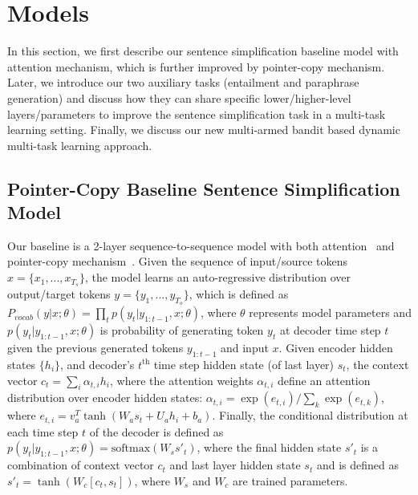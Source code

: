 \documentclass[11pt]{article}
\begin{document}
 

\section{Models}
\label{sec:models}

In this section, we first describe our sentence simplification baseline model with attention mechanism, which is further improved by pointer-copy mechanism. Later, we introduce our two auxiliary tasks (entailment and paraphrase generation) and discuss how they can share specific lower/higher-level layers/parameters to improve the sentence simplification task in a multi-task learning setting. Finally, we discuss our new multi-armed bandit based dynamic multi-task learning approach.

\subsection{Pointer-Copy Baseline Sentence Simplification Model}
Our baseline is a 2-layer sequence-to-sequence model with both attention~\cite{bahdanau2014attention} and pointer-copy mechanism~\cite{see2017get}. Given the sequence of input/source tokens $x = \{x_1, ..., x_{T_s}\}$, the model learns an auto-regressive distribution over output/target tokens $y = \{y_1, ..., y_{T_o}\}$, which is defined as $P_{vocab}(y \vert x; \theta) = \prod_t p(y_t \vert y_{1:t-1}, x; \theta)$, 
where $\theta$ represents model parameters and $p(y_t \vert y_{1:t-1}, x; \theta)$ is probability of generating token $y_t$ at decoder time step $t$ given the previous generated tokens $y_{1:t-1}$ and input $x$. Given encoder hidden states $\{h_i\}$, and decoder's $t^{\text{th}}$ time step hidden state (of last layer) $s_t$, the context vector $c_t=\sum_i \alpha_{t,i} h_i$, where the attention weights $\alpha_{t,i}$ define an attention distribution over encoder hidden states: $\alpha_{t,i} = \exp(e_{t,i})/\sum_k\exp(e_{t,k})$, where $e_{t,i} = v_a^T \tanh(W_a s_t + U_a h_i + b_a)$.
Finally, the conditional distribution at each time step $t$ of the decoder is defined as $p(y_t|y_{1:t-1},x;\theta) = \textrm{softmax}(W_s s'_t)$, where the final hidden state $s'_t$ is a combination of context vector $c_t$ and last layer hidden state $s_t$ and is defined as $s'_t = \tanh(W_c[c_t,s_t])$, where $W_s$ and $W_c$ are trained parameters.
\end{document}
